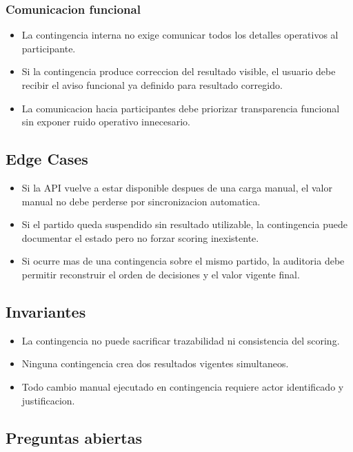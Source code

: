 \subsubsection{Comunicacion funcional}

\begin{itemize}
  \item La contingencia interna no exige comunicar todos los detalles operativos al participante.
  \item Si la contingencia produce correccion del resultado visible, el usuario debe recibir el aviso funcional ya definido para resultado corregido.
  \item La comunicacion hacia participantes debe priorizar transparencia funcional sin exponer ruido operativo innecesario.
\end{itemize}

\subsection{Edge Cases}

\begin{itemize}
  \item Si la API vuelve a estar disponible despues de una carga manual, el valor manual no debe perderse por sincronizacion automatica.
  \item Si el partido queda suspendido sin resultado utilizable, la contingencia puede documentar el estado pero no forzar scoring inexistente.
  \item Si ocurre mas de una contingencia sobre el mismo partido, la auditoria debe permitir reconstruir el orden de decisiones y el valor vigente final.
\end{itemize}

\subsection{Invariantes}

\begin{itemize}
  \item La contingencia no puede sacrificar trazabilidad ni consistencia del scoring.
  \item Ninguna contingencia crea dos resultados vigentes simultaneos.
  \item Todo cambio manual ejecutado en contingencia requiere actor identificado y justificacion.
\end{itemize}

\subsection{Preguntas abiertas}

